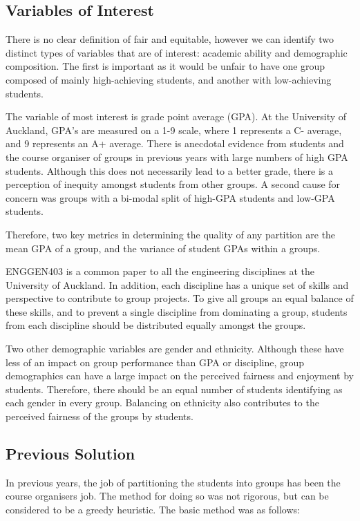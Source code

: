 \documentclass[12pt]{ORSNZ}
\begin{document}
\subsection{Variables of Interest}
There is no clear definition of fair and equitable, however we can identify two distinct types of variables that are of interest: academic ability and demographic composition. The first is important as it would be unfair to have one group composed of mainly high-achieving students, and another with low-achieving students. 

The variable of most interest is grade point average (GPA). At the University of Auckland, GPA's are measured on a 1-9 scale, where 1 represents a C- average, and 9 represents an A+ average. There is anecdotal evidence from students and the course organiser of groups in previous years with large numbers of high GPA students. Although this does not necessarily lead to a better grade, there is a perception of inequity amongst students from other groups. A second cause for concern was groups with a bi-modal split of high-GPA students and low-GPA students. 

Therefore, two key metrics in determining the quality of any partition are the mean GPA of a group, and the variance of student GPAs within a groups.

ENGGEN403 is a common paper to all the engineering disciplines at the University of Auckland. In addition, each discipline has a unique set of skills and perspective to contribute to group projects. To give all groups an equal balance of these skills, and to prevent a single discipline from dominating a group, students from each discipline should be distributed equally amongst the groups.

Two other demographic variables are gender and ethnicity. Although these have less of an impact on group performance than GPA or discipline, group demographics can have a large impact on the perceived fairness and enjoyment by students. Therefore, there should be an equal number of students identifying as each gender in every group. Balancing on ethnicity also contributes to the perceived fairness of the groups by students.

\subsection{Previous Solution}
In previous years, the job of partitioning the students into groups has been the course organisers job. The method for doing so was not rigorous, but can be considered to be a greedy heuristic. The basic method was as follows:
\end{document}
